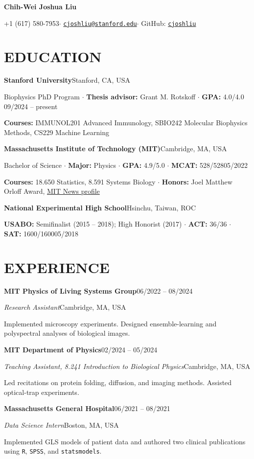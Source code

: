 \documentclass[11pt,letterpaper]{article}
\newcommand{\entry}[2]{\textbf{#1}\hfill #2\par}
\begin{document}
\fontsize{10.5}{12}\selectfont
\begin{center}
{\fontsize{18}{22}\selectfont\bfseries Chih-Wei Joshua Liu}\par
\vspace{4pt}
+1 (617) 580-7953\enspace$\cdot$\enspace
\href{mailto:cjoshliu@stanford.edu}{\texttt{cjoshliu@stanford.edu}}\enspace$\cdot$\enspace
GitHub: \href{https://github.com/cjoshliu}{\texttt{cjoshliu}}
\end{center}
\vspace{-14pt}

\section{EDUCATION}
\entry{Stanford University}{Stanford, CA, USA}
Biophysics PhD Program $\cdot$ \textbf{Thesis advisor:} Grant M. Rotskoff $\cdot$ \textbf{GPA:} 4.0/4.0 \hfill 09/2024 -- present\par
\textbf{Courses:} IMMUNOL201 Advanced Immunology, SBIO242 Molecular Biophysics Methods, CS229 Machine Learning\par

\vspace{4pt}
\entry{Massachusetts Institute of Technology (MIT)}{Cambridge, MA, USA}
Bachelor of Science $\cdot$ \textbf{Major:} Physics $\cdot$ \textbf{GPA:} 4.9/5.0 $\cdot$ \textbf{MCAT:} 528/528\hfill 05/2022\par
\textbf{Courses:} 18.650 Statistics, 8.591 Systems Biology $\cdot$ \textbf{Honors:} Joel Matthew Orloff Award, \href{https://news.mit.edu/2022/physics-gut-brain-health-chih-wei-joshua-liu-0603}{MIT News profile} \par
\vspace{4pt}
\entry{National Experimental High School}{Hsinchu, Taiwan, ROC}
\textbf{USABO:} Semifinalist (2015 -- 2018); High Honorist (2017) $\cdot$ \textbf{ACT:} 36/36 $\cdot$ \textbf{SAT:} 1600/1600\hfill 05/2018

\section{EXPERIENCE}
\entry{MIT Physics of Living Systems Group}{06/2022 -- 08/2024}\par
\textit{Research Assistant}\hfill Cambridge, MA, USA\par
Implemented microscopy experiments. Designed ensemble-learning and polyspectral analyses of biological images.\par
\entry{MIT Department of Physics}{02/2024 -- 05/2024}
\textit{Teaching Assistant, 8.241 Introduction to Biological Physics}\hfill Cambridge, MA, USA\par
Led recitations on protein folding, diffusion, and imaging methods.
Assisted optical-trap experiments.
\par
\entry{Massachusetts General Hospital}{06/2021 -- 08/2021}
\textit{Data Science Intern}\hfill Boston, MA, USA\par
Implemented GLS models of patient data and authored two clinical publications using \texttt{R}, \texttt{SPSS}, and \texttt{statsmodels}.\par
\end{document}
